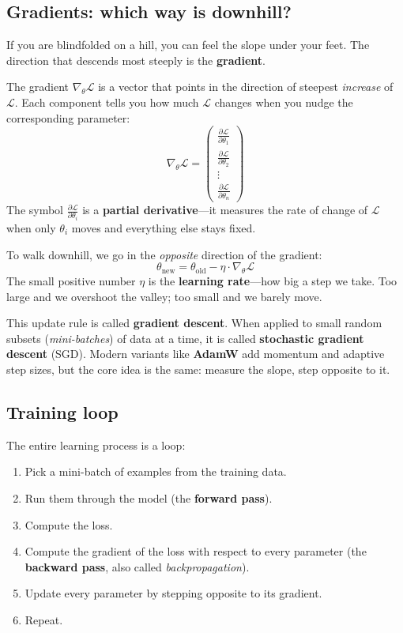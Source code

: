 \documentclass[11pt,a4paper]{article}
\theoremstyle{definition}
\begin{document}
\subsection{Gradients: which way is downhill?}

If you are blindfolded on a hill, you can feel the slope under your
feet. The direction that descends most steeply is the
\textbf{gradient}.

\begin{mathbox}[Gradient]
The gradient $\nabla_\theta \mathcal{L}$ is a vector that points in
the direction of steepest \emph{increase} of $\mathcal{L}$. Each
component tells you how much $\mathcal{L}$ changes when you nudge the
corresponding parameter:
\[
\nabla_\theta \mathcal{L}
= \begin{pmatrix}
    \frac{\partial \mathcal{L}}{\partial \theta_1} \\[4pt]
    \frac{\partial \mathcal{L}}{\partial \theta_2} \\
    \vdots \\
    \frac{\partial \mathcal{L}}{\partial \theta_n}
  \end{pmatrix}
\]
The symbol $\frac{\partial \mathcal{L}}{\partial \theta_i}$ is a
\textbf{partial derivative}---it measures the rate of change of
$\mathcal{L}$ when only $\theta_i$ moves and everything else stays
fixed.
\end{mathbox}

To walk downhill, we go in the \emph{opposite} direction of the
gradient:
\[
\theta_{\text{new}} = \theta_{\text{old}} - \eta \cdot \nabla_\theta \mathcal{L}
\]
The small positive number $\eta$ is the \textbf{learning rate}---how
big a step we take. Too large and we overshoot the valley; too small
and we barely move.

This update rule is called \textbf{gradient descent}. When applied to
small random subsets (\emph{mini-batches}) of data at a time, it is
called \textbf{stochastic gradient descent} (SGD). Modern variants
like \textbf{AdamW} add momentum and adaptive step sizes, but the core
idea is the same: measure the slope, step opposite to it.

\subsection{Training loop}

The entire learning process is a loop:

\begin{enumerate}[nosep]
  \item Pick a mini-batch of examples from the training data.
  \item Run them through the model (the \textbf{forward pass}).
  \item Compute the loss.
  \item Compute the gradient of the loss with respect to every
        parameter (the \textbf{backward pass}, also called
        \emph{backpropagation}).
  \item Update every parameter by stepping opposite to its gradient.
  \item Repeat.
\end{enumerate}
\end{document}
